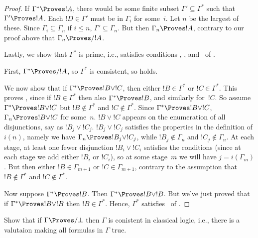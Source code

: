 \documentclass[../../../include/open-logic-section]{subfiles}
\begin{document}
\begin{proof}
  If $\Gamma^* \Proves !A$, there would be some finite subset $\Gamma'
  \subseteq \Gamma^*$ such that $\Gamma' \Proves !A$. Each $!D \in
  \Gamma'$ must be in $\Gamma_i$ for some~$i$.  Let $n$ be the largest
  of these. Since $\Gamma_i \subseteq \Gamma_n$ if $i \le n$, $\Gamma'
  \subseteq \Gamma_n$. But then $\Gamma_n \Proves !A$, contrary to our
  proof above that $\Gamma_n \Proves/ !A$.

  Lastly, we show that $\Gamma^*$ is prime, i.e., satisfies conditions
  , , and~ of
  .

  First, $\Gamma^* \Proves/ !A$, so $\Gamma^*$ is
  consistent, so  holds.

  We now show that if $\Gamma^* \Proves !B \lor !C$, then either $!B
  \in \Gamma^*$ or $!C \in \Gamma^*$. This proves ,
  since if $!B \in \Gamma^*$ then also $\Gamma^* \Proves !B$, and
  similarly for~$!C$. So assume $\Gamma^* \Proves !B \lor !C$ but $!B
  \notin \Gamma^*$ and $!C \notin \Gamma^*$. Since $\Gamma^* \Proves
  !B \lor !C$, $\Gamma_n \Proves !B \lor !C$ for some~$n$. $!B \lor
  !C$ appears on the enumeration of all disjunctions, say as $!B_j
  \lor !C_j$. $!B_j \lor !C_j$ satisfies the properties in the
  definition of $i(n)$, namely we have $\Gamma_n \Proves !B_j
  \lor !C_j$, while $!B_j \notin \Gamma_n$ and $!C_j \notin \Gamma_n$. At
  each stage, at least one fewer disjunction $!B_i \lor !C_i$
  satisfies the conditions (since at each stage we add either $!B_i$
  or $!C_i$), so at some stage~$m$ we will have $j = i(\Gamma_m)$. But
  then either $!B \in \Gamma_{m+1}$ or $!C \in \Gamma_{m+1}$, contrary
  to the assumption that $!B \notin \Gamma^*$ and $!C \notin
  \Gamma^*$.

  Now suppose $\Gamma^* \Proves !B$. Then $\Gamma^* \Proves !B \lor
  !B$. But we've just proved that if $\Gamma^* \Proves !B \lor !B$
  then $!B \in \Gamma^*$. Hence, $\Gamma^*$
  satisfies~ of .
\end{proof}

\begin{prob}
Show that if $\Gamma \Proves/ \bot$ then $\Gamma$ is conistent in classical logic, i.e., there is a valutaion making all formulas in $\Gamma$ true.
\end{prob}
\end{document}
